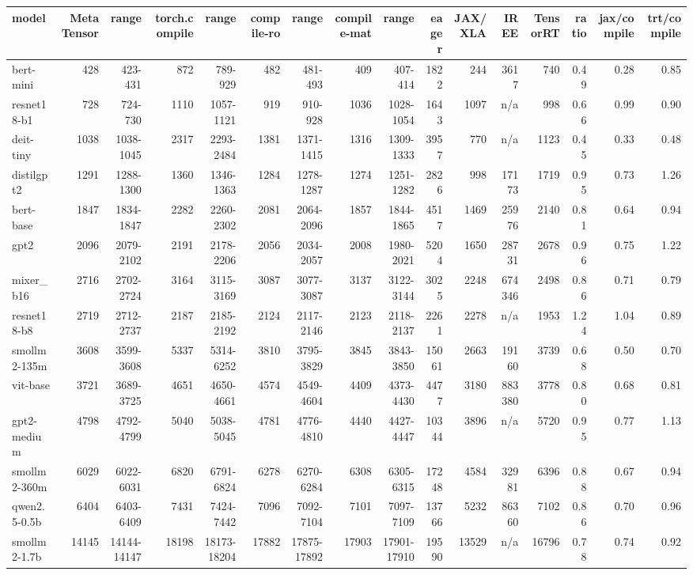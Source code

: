 \begin{tabular}{lrrrrrrrrrrrrrrr}
\toprule
model & MetaTensor & range & torch.compile & range & compile-ro & range & compile-mat & range & eager & JAX/XLA & IREE & TensorRT & ratio & jax/compile & trt/compile \\
\midrule
bert-mini & 428 & 423-431 & 872 & 789-929 & 482 & 481-493 & 409 & 407-414 & 1822 & 244 & 3617 & 740 & 0.49 & 0.28 & 0.85 \\
resnet18-b1 & 728 & 724-730 & 1110 & 1057-1121 & 919 & 910-928 & 1036 & 1028-1054 & 1643 & 1097 & n/a & 998 & 0.66 & 0.99 & 0.90 \\
deit-tiny & 1038 & 1038-1045 & 2317 & 2293-2484 & 1381 & 1371-1415 & 1316 & 1309-1333 & 3957 & 770 & n/a & 1123 & 0.45 & 0.33 & 0.48 \\
distilgpt2 & 1291 & 1288-1300 & 1360 & 1346-1363 & 1284 & 1278-1287 & 1274 & 1251-1282 & 2826 & 998 & 17173 & 1719 & 0.95 & 0.73 & 1.26 \\
bert-base & 1847 & 1834-1847 & 2282 & 2260-2302 & 2081 & 2064-2096 & 1857 & 1844-1865 & 4517 & 1469 & 25976 & 2140 & 0.81 & 0.64 & 0.94 \\
gpt2 & 2096 & 2079-2102 & 2191 & 2178-2206 & 2056 & 2034-2057 & 2008 & 1980-2021 & 5204 & 1650 & 28731 & 2678 & 0.96 & 0.75 & 1.22 \\
mixer\_b16 & 2716 & 2702-2724 & 3164 & 3115-3169 & 3087 & 3077-3087 & 3137 & 3122-3144 & 3025 & 2248 & 674346 & 2498 & 0.86 & 0.71 & 0.79 \\
resnet18-b8 & 2719 & 2712-2737 & 2187 & 2185-2192 & 2124 & 2117-2146 & 2123 & 2118-2137 & 2261 & 2278 & n/a & 1953 & 1.24 & 1.04 & 0.89 \\
smollm2-135m & 3608 & 3599-3608 & 5337 & 5314-6252 & 3810 & 3795-3829 & 3845 & 3843-3850 & 15061 & 2663 & 19160 & 3739 & 0.68 & 0.50 & 0.70 \\
vit-base & 3721 & 3689-3725 & 4651 & 4650-4661 & 4574 & 4549-4604 & 4409 & 4373-4430 & 4477 & 3180 & 883380 & 3778 & 0.80 & 0.68 & 0.81 \\
gpt2-medium & 4798 & 4792-4799 & 5040 & 5038-5045 & 4781 & 4776-4810 & 4440 & 4427-4447 & 10344 & 3896 & n/a & 5720 & 0.95 & 0.77 & 1.13 \\
smollm2-360m & 6029 & 6022-6031 & 6820 & 6791-6824 & 6278 & 6270-6284 & 6308 & 6305-6315 & 17248 & 4584 & 32981 & 6396 & 0.88 & 0.67 & 0.94 \\
qwen2.5-0.5b & 6404 & 6403-6409 & 7431 & 7424-7442 & 7096 & 7092-7104 & 7101 & 7097-7109 & 13766 & 5232 & 86360 & 7102 & 0.86 & 0.70 & 0.96 \\
smollm2-1.7b & 14145 & 14144-14147 & 18198 & 18173-18204 & 17882 & 17875-17892 & 17903 & 17901-17910 & 19590 & 13529 & n/a & 16796 & 0.78 & 0.74 & 0.92 \\
\bottomrule
\end{tabular}
